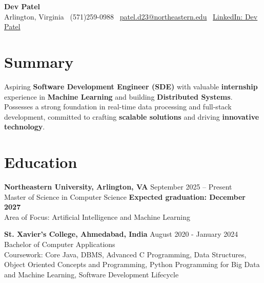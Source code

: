 \documentclass[a4paper,10pt]{article}
\begin{document}
\begin{center}
\vspace{-3mm}
    \fontsize{16}{18}\selectfont \textbf{Dev Patel} \\
    \vspace{0mm}
    \normalsize Arlington, Virginia \textbar\ (571)259-0988  \textbar\ \href{mailto:patel.d23@northeastern.edu}{patel.d23@northeastern.edu} \textbar\ \href{https://www.linkedin.com/in/devxpatel//}{LinkedIn: Dev Patel} \\
\end{center}

\section*{Summary}
Aspiring \textbf{Software Development Engineer (SDE)} with valuable \textbf{internship} experience in \textbf{Machine Learning} and building \textbf{Distributed Systems}. Possesses a strong foundation in real-time data processing and full-stack development, committed to crafting \textbf{scalable solutions} and driving \textbf{innovative technology}.
 
\vspace{ 0 mm}
\section*{Education}
\textbf{Northeastern University, Arlington, VA} \hfill September 2025 -- Present\\
Master of Science in Computer Science \hfill \textbf{Expected graduation: December 2027} \\
Area of Focus: Artificial Intelligence and Machine Learning

\vspace{1 mm} %
\textbf{St. Xavier's College, Ahmedabad, India} \hfill August 2020 - January 2024 \\
Bachelor of Computer Applications\\
Coursework: Core Java, DBMS, Advanced C Programming, Data Structures, Object Oriented Concepts and Programming, Python Programming for Big Data and Machine Learning, Software Development Lifecycle
\end{document}

